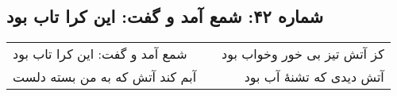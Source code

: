 \begin{center}
\section*{شماره ۴۲: شمع آمد و گفت: این کرا تاب بود}
\label{sec:042}
\begin{longtable}{l p{0.5cm} r}
شمع آمد و گفت: این کرا تاب بود
&&
کز آتش تیز بی خور وخواب بود
\\
آبم کند آتش که به من بسته دلست
&&
آتش دیدی که تشنهٔ آب بود
\\
\end{longtable}
\end{center}
